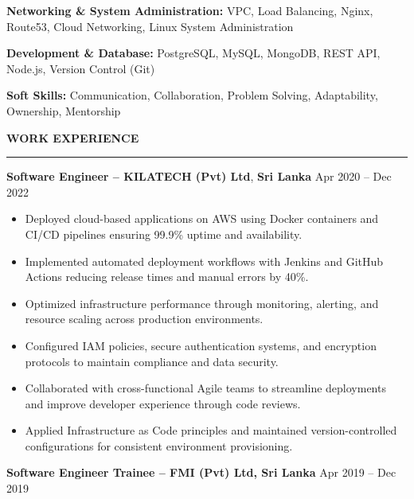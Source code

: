 \documentclass[10pt,letterpaper]{article}
\begin{document}
\textbf{Networking \& System Administration:} VPC, Load Balancing, Nginx, Route53, Cloud Networking, Linux System Administration

\textbf{Development \& Database:} PostgreSQL, MySQL, MongoDB, REST API, Node.js, Version Control (Git)

\textbf{Soft Skills:} Communication, Collaboration, Problem Solving, Adaptability, Ownership, Mentorship

\vspace{8pt}

\textbf{WORK EXPERIENCE}\\[-8pt]
\noindent\rule{\textwidth}{1pt}

\vspace{-2pt}

\textbf{Software Engineer -- KILATECH (Pvt) Ltd}, \textbf{Sri Lanka} \hfill Apr 2020 -- Dec 2022

\vspace{-1pt}

\begin{itemize}
\item Deployed cloud-based applications on AWS using Docker containers and CI/CD pipelines ensuring 99.9\% uptime and availability.
\item Implemented automated deployment workflows with Jenkins and GitHub Actions reducing release times and manual errors by 40\%.
\item Optimized infrastructure performance through monitoring, alerting, and resource scaling across production environments.
\item Configured IAM policies, secure authentication systems, and encryption protocols to maintain compliance and data security.
\item Collaborated with cross-functional Agile teams to streamline deployments and improve developer experience through code reviews.
\item Applied Infrastructure as Code principles and maintained version-controlled configurations for consistent environment provisioning.
\end{itemize}

\textbf{Software Engineer Trainee -- FMI (Pvt) Ltd, Sri Lanka} \hfill Apr 2019 -- Dec 2019

\vspace{-1pt}
\end{document}
